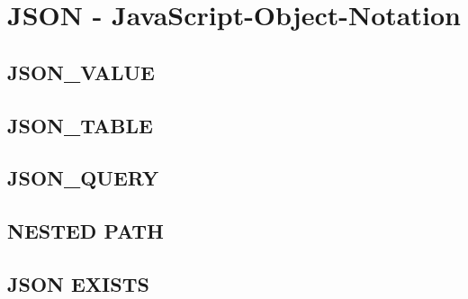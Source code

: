\section[JSON]{JSON - JavaScript-Object-Notation}
\label{sec:json}

\subsection{JSON\_VALUE}
\label{sec:json.json_value}

\subsection{JSON\_TABLE}
\label{sec:json.jason_table}

\subsection{JSON\_QUERY}
\label{sec:json.jason_query}

\subsection{NESTED PATH}
\label{sec:json.nested_path}

\subsection{JSON EXISTS}
\label{sec:json.json_exists}
